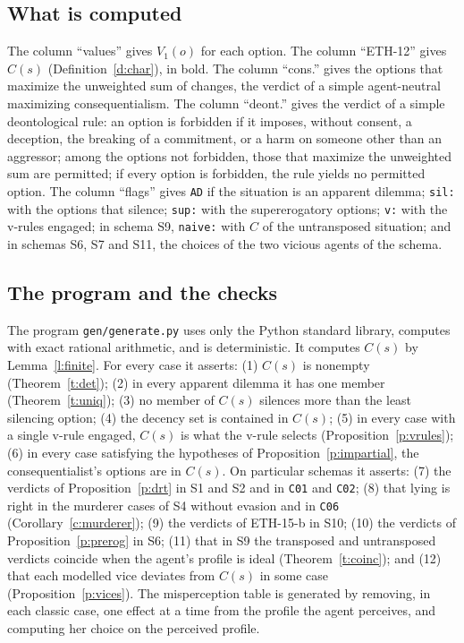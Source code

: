 \documentclass{situationist-preprint}
\newcommand{\Ch}{C}
\begin{document}
\subsection*{What is computed}

The column \enquote{values} gives $V_1(o)$ for each option. The column \enquote{ETH-12} gives $\Ch(s)$ (Definition~\ref{d:char}), in bold. The column \enquote{cons.} gives the options that maximize the unweighted sum of changes, the verdict of a simple agent-neutral maximizing consequentialism. The column \enquote{deont.} gives the verdict of a simple deontological rule: an option is forbidden if it imposes, without consent, a deception, the breaking of a commitment, or a harm on someone other than an aggressor; among the options not forbidden, those that maximize the unweighted sum are permitted; if every option is forbidden, the rule yields no permitted option. The column \enquote{flags} gives \texttt{AD} if the situation is an apparent dilemma; \texttt{sil:} with the options that silence; \texttt{sup:} with the supererogatory options; \texttt{v:} with the v-rules engaged; in schema S9, \texttt{naive:} with $\Ch$ of the untransposed situation; and in schemas S6, S7 and S11, the choices of the two vicious agents of the schema.

\subsection*{The program and the checks}

The program \texttt{gen/generate.py} uses only the Python standard library, computes with exact rational arithmetic, and is deterministic. It computes $\Ch(s)$ by Lemma~\ref{l:finite}. For every case it asserts: (1) $\Ch(s)$ is nonempty (Theorem~\ref{t:det}); (2) in every apparent dilemma it has one member (Theorem~\ref{t:uniq}); (3) no member of $\Ch(s)$ silences more than the least silencing option; (4) the decency set is contained in $\Ch(s)$; (5) in every case with a single v-rule engaged, $\Ch(s)$ is what the v-rule selects (Proposition~\ref{p:vrules}); (6) in every case satisfying the hypotheses of Proposition~\ref{p:impartial}, the consequentialist's options are in $\Ch(s)$. On particular schemas it asserts: (7) the verdicts of Proposition~\ref{p:drt} in S1 and S2 and in \texttt{C01} and \texttt{C02}; (8) that lying is right in the murderer cases of S4 without evasion and in \texttt{C06} (Corollary~\ref{c:murderer}); (9) the verdicts of ETH-15-b in S10; (10) the verdicts of Proposition~\ref{p:prerog} in S6; (11) that in S9 the transposed and untransposed verdicts coincide when the agent's profile is ideal (Theorem~\ref{t:coinc}); and (12) that each modelled vice deviates from $\Ch(s)$ in some case (Proposition~\ref{p:vices}). The misperception table is generated by removing, in each classic case, one effect at a time from the profile the agent perceives, and computing her choice on the perceived profile.
\end{document}
